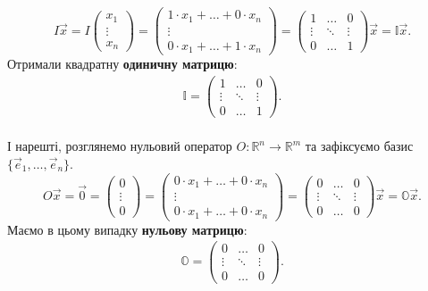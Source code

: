 \documentclass{math_library}
\begin{document}
	\[
	I \vec{x} = I \begin{pmatrix}
	x_1 \\ \vdots \\ x_n
	\end{pmatrix} = \begin{pmatrix}
	1 \cdot x_1 + \dots + 0 \cdot x_n \\ \vdots \\ 0 \cdot x_1 + \dots + 1 \cdot x_n
	\end{pmatrix} = \begin{pmatrix}
	1 & \dots & 0 \\
	\vdots & \ddots & \vdots \\
	0 & \dots & 1
	\end{pmatrix} \vec{x} = \mathbb{I} \vec{x}.
	\]
	Отримали квадратну \textbf{одиничну матрицю}:
	\begin{align*}
	\mathbb{I} = \begin{pmatrix}
	1 & \dots & 0 \\
	\vdots & \ddots & \vdots \\
	0 & \dots & 1
	\end{pmatrix}.
	\end{align*}
	\bigskip \\
	І нарешті, розглянемо нульовий оператор $O \colon \mathbb{R}^n \to \mathbb{R}^m$ та зафіксуємо базис $\{\vec{e}_1, \dots, \vec{e}_n\}$.
	\[
	O \vec{x} = \vec{0} = \begin{pmatrix}
	0 \\ \vdots \\ 0
	\end{pmatrix} = \begin{pmatrix}
	0 \cdot x_1 + \dots + 0 \cdot x_n \\ \vdots \\ 0 \cdot x_1 + \dots + 0 \cdot x_n 
	\end{pmatrix} = \begin{pmatrix}
	0 & \dots & 0 \\
	\vdots & \ddots & \vdots \\
	0 & \dots & 0
	\end{pmatrix} \vec{x} = \mathbb{O} \vec{x}.
	\]
	Маємо в цьому випадку \textbf{нульову матрицю}:
	\begin{align*}
	\mathbb{O} = \begin{pmatrix}
	0 & \dots & 0 \\
	\vdots & \ddots & \vdots \\
	0 & \dots & 0
	\end{pmatrix}.
	\end{align*}
\end{document}
